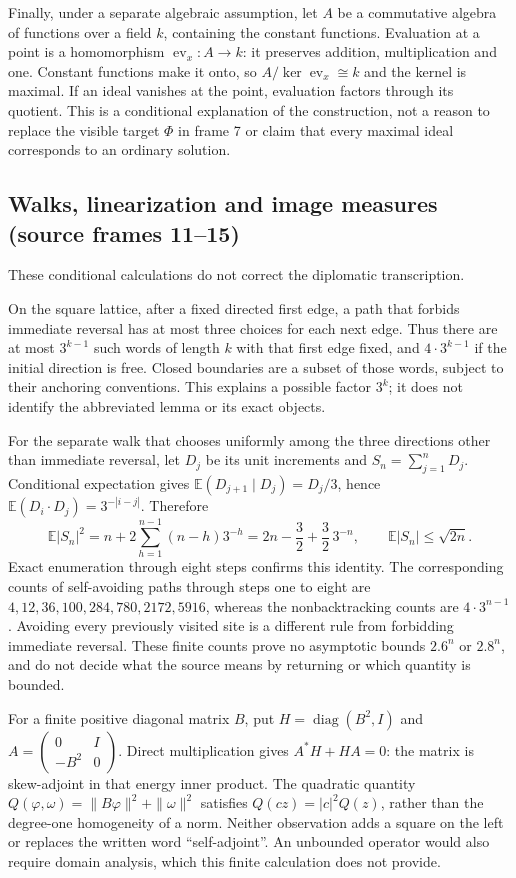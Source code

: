 \documentclass[11pt]{article}
\begin{document}
Finally, under a separate algebraic assumption, let \(A\) be a commutative algebra of functions over a field \(k\), containing the constant functions. Evaluation at a point is a homomorphism \(\operatorname{ev}_x:A\to k\): it preserves addition, multiplication and one. Constant functions make it onto, so \(A/\ker\operatorname{ev}_x\cong k\) and the kernel is maximal. If an ideal vanishes at the point, evaluation factors through its quotient. This is a conditional explanation of the construction, not a reason to replace the visible target \(\Phi\) in frame 7 or claim that every maximal ideal corresponds to an ordinary solution.


\subsection*{Walks, linearization and image measures (source frames 11--15)}
These conditional calculations do not correct the diplomatic transcription.

On the square lattice, after a fixed directed first edge, a path that forbids immediate reversal has at most three choices for each next edge. Thus there are at most $3^{k-1}$ such words of length $k$ with that first edge fixed, and $4\cdot3^{k-1}$ if the initial direction is free. Closed boundaries are a subset of those words, subject to their anchoring conventions. This explains a possible factor $3^k$; it does not identify the abbreviated lemma or its exact objects.

For the separate walk that chooses uniformly among the three directions other than immediate reversal, let $D_j$ be its unit increments and $S_n=\sum_{j=1}^nD_j$. Conditional expectation gives $\mathbb E(D_{j+1}\mid D_j)=D_j/3$, hence $\mathbb E(D_i\cdot D_j)=3^{-|i-j|}$. Therefore
\[
\mathbb E|S_n|^2=n+2\sum_{h=1}^{n-1}(n-h)3^{-h}
=2n-\frac32+\frac32\,3^{-n},\qquad
\mathbb E|S_n|\leq\sqrt{2n}.
\]
Exact enumeration through eight steps confirms this identity. The corresponding counts of self-avoiding paths through steps one to eight are $4,12,36,100,284,780,2172,5916$, whereas the nonbacktracking counts are $4\cdot3^{n-1}$. Avoiding every previously visited site is a different rule from forbidding immediate reversal. These finite counts prove no asymptotic bounds $2.6^n$ or $2.8^n$, and do not decide what the source means by returning or which quantity is bounded.

For a finite positive diagonal matrix $B$, put $H=\operatorname{diag}(B^2,I)$ and $A=\left(\begin{smallmatrix}0&I\\-B^2&0\end{smallmatrix}\right)$. Direct multiplication gives $A^*H+HA=0$: the matrix is skew-adjoint in that energy inner product. The quadratic quantity $Q(\varphi,\omega)=\|B\varphi\|^2+\|\omega\|^2$ satisfies $Q(cz)=|c|^2Q(z)$, rather than the degree-one homogeneity of a norm. Neither observation adds a square on the left or replaces the written word “self-adjoint”. An unbounded operator would also require domain analysis, which this finite calculation does not provide.
\end{document}
